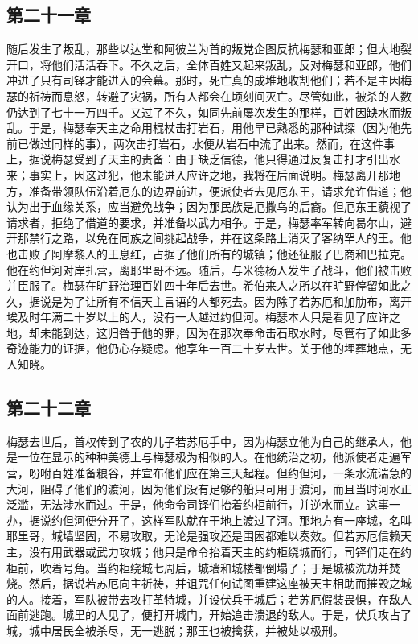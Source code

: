 
\subsection{第二十一章}

随后发生了叛乱，那些以达堂和阿彼兰为首的叛党企图反抗梅瑟和亚郎；但大地裂开口，将他们活活吞下。不久之后，全体百姓又起来叛乱，反对梅瑟和亚郎，他们冲进了只有司铎才能进入的会幕。那时，死亡真的成堆地收割他们；若不是主因梅瑟的祈祷而息怒，转避了灾祸，所有人都会在顷刻间灭亡。尽管如此，被杀的人数仍达到了七十一万四千。又过了不久，如同先前屡次发生的那样，百姓因缺水而叛乱。于是，梅瑟奉天主之命用棍杖击打岩石，用他早已熟悉的那种试探（因为他先前已做过同样的事），两次击打岩石，水便从岩石中流了出来。然而，在这件事上，据说梅瑟受到了天主的责备：由于缺乏信德，他只得通过反复击打才引出水来；事实上，因这过犯，他未能进入应许之地，我将在后面说明。梅瑟离开那地方，准备带领队伍沿着厄东的边界前进，便派使者去见厄东王，请求允许借道；他认为出于血缘关系，应当避免战争；因为那民族是厄撒乌的后裔。但厄东王藐视了请求者，拒绝了借道的要求，并准备以武力相争。于是，梅瑟率军转向曷尔山，避开那禁行之路，以免在同族之间挑起战争，并在这条路上消灭了客纳罕人的王。他也击败了阿摩黎人的王息红，占据了他们所有的城镇；他还征服了巴商和巴拉克。他在约但河对岸扎营，离耶里哥不远。随后，与米德杨人发生了战斗，他们被击败并臣服了。梅瑟在旷野治理百姓四十年后去世。希伯来人之所以在旷野停留如此之久，据说是为了让所有不信天主言语的人都死去。因为除了若苏厄和加肋布，离开埃及时年满二十岁以上的人，没有一人越过约但河。梅瑟本人只是看见了应许之地，却未能到达，这归咎于他的罪，因为在那次奉命击石取水时，尽管有了如此多奇迹能力的证据，他仍心存疑虑。他享年一百二十岁去世。关于他的埋葬地点，无人知晓。\par


\subsection{第二十二章}

梅瑟去世后，首权传到了农的儿子若苏厄手中，因为梅瑟立他为自己的继承人，他是一位在显示的种种美德上与梅瑟极为相似的人。在他统治之初，他派使者走遍军营，吩咐百姓准备粮谷，并宣布他们应在第三天起程。但约但河，一条水流湍急的大河，阻碍了他们的渡河，因为他们没有足够的船只可用于渡河，而且当时河水正泛滥，无法涉水而过。于是，他命令司铎们抬着约柜前行，并逆水而立。这事一办，据说约但河便分开了，这样军队就在干地上渡过了河。那地方有一座城，名叫耶里哥，城墙坚固，不易攻取，无论是强攻还是围困都难以奏效。但若苏厄信赖天主，没有用武器或武力攻城；他只是命令抬着天主的约柜绕城而行，司铎们走在约柜前，吹着号角。当约柜绕城七周后，城墙和城楼都倒塌了；于是城被洗劫并焚烧。然后，据说若苏厄向主祈祷，并诅咒任何试图重建这座被天主相助而摧毁之城的人。接着，军队被带去攻打革特城，并设伏兵于城后；若苏厄假装畏惧，在敌人面前逃跑。城里的人见了，便打开城门，开始追击溃退的敌人。于是，伏兵攻占了城，城中居民全被杀尽，无一逃脱；那王也被擒获，并被处以极刑。\par


